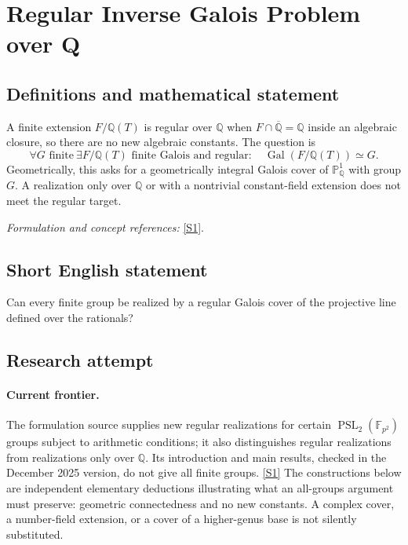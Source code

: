 \documentclass[11pt,a4paper]{article}
\newcommand{\Q}{\mathbb{Q}}
\newcommand{\F}{\mathbb{F}}
\newcommand{\PP}{\mathbb P}
\newcommand{\sref}[2]{\hyperlink{source:#1:#2}{[S#2]}}
\newif\ifshowcatalogue
\newcommand{\cataloguescope}[1]{\ifshowcatalogue
 \paragraph{Exact scope in the supplied catalogue.}
 \begin{quote}\small #1\end{quote}\fi}
\numberwithin{equation}{section}
\begin{document}
\setcounter{section}{0}
\clearpage
\section*{\texorpdfstring{Regular Inverse Galois Problem over Q}{Regular Inverse Galois Problem over Q}}\label{30006738}
\subsection{Definitions and mathematical statement}
A finite extension $F/\Q(T)$ is regular over $\Q$ when $F\cap\overline{\Q}=\Q$ inside an algebraic closure, so there are no new algebraic constants. The question is
\[
 \forall G\text{ finite}\ \exists F/\Q(T)\text{ finite Galois and regular}:\quad
 \operatorname{Gal}(F/\Q(T))\simeq G.
\]
Geometrically, this asks for a geometrically integral Galois cover of $\PP^1_{\Q}$ with group $G$. A realization only over $\Q$ or with a nontrivial constant-field extension does not meet the regular target.
\par\smallskip\textit{Formulation and concept references:} \sref{30006738}{1}.
\cataloguescope{For every finite group G, does there exist a finite Galois extension F/Q(T) with Gal(F/Q(T)) isomorphic to G and Q algebraically closed in F? Equivalently, require a geometrically integral Galois cover of the projective line over Q with group G. A positive resolution proves this for all finite groups; a negative resolution proves nonexistence for at least one finite group.}
\subsection{Short English statement}
Can every finite group be realized by a regular Galois cover of the projective line defined over the rationals?
\subsection{Research attempt}

\paragraph{Current frontier.}
The formulation source supplies new regular realizations for certain
$\operatorname{PSL}_2(\F_{p^2})$ groups subject to arithmetic conditions;
it also distinguishes regular realizations from realizations only over
$\Q$.  Its introduction and main results, checked in the December 2025
version, do not give all finite groups. \sref{30006738}{1}
The constructions below are independent elementary deductions illustrating
what an all-groups argument must preserve: geometric connectedness and
no new constants.  A complex cover, a number-field extension, or a cover
of a higher-genus base is not silently substituted.
\end{document}
